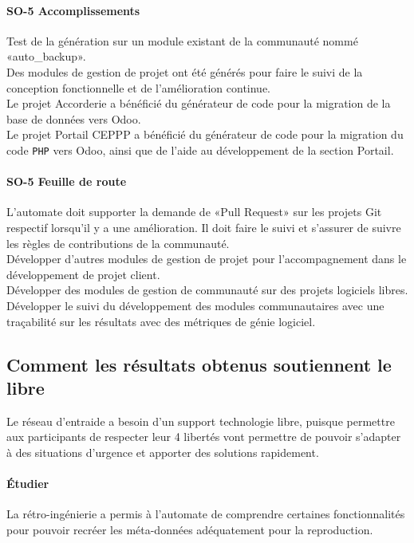 \paragraph{SO-5 Accomplissements}
Test de la génération sur un module existant de la communauté nommé «auto\_backup».\\
Des modules de gestion de projet ont été générés pour faire le suivi de la conception fonctionnelle et de l’amélioration continue.\\
Le projet Accorderie a bénéficié du générateur de code pour la migration de la base de données vers Odoo.\\
Le projet Portail CEPPP a bénéficié du générateur de code pour la migration du code \texttt{PHP} vers Odoo, ainsi que de l’aide au développement de la section Portail.

\paragraph{SO-5 Feuille de route}
L’automate doit supporter la demande de «Pull Request» sur les projets Git respectif lorsqu’il y a une amélioration. Il doit faire le suivi et s’assurer de suivre les règles de contributions de la communauté.\\
Développer d’autres modules de gestion de projet pour l’accompagnement dans le développement de projet client.\\
Développer des modules de gestion de communauté sur des projets logiciels libres.\\
Développer le suivi du développement des modules communautaires avec une traçabilité sur les résultats avec des métriques de génie logiciel.

\subsection{Comment les résultats obtenus soutiennent le libre}

Le réseau d’entraide a besoin d’un support technologie libre, puisque permettre aux participants de respecter leur 4 libertés vont permettre de pouvoir s’adapter à des situations d’urgence et apporter des solutions rapidement.

\paragraph{Étudier}
La rétro-ingénierie a permis à l’automate de comprendre certaines fonctionnalités pour pouvoir recréer les méta-données adéquatement pour la reproduction.

